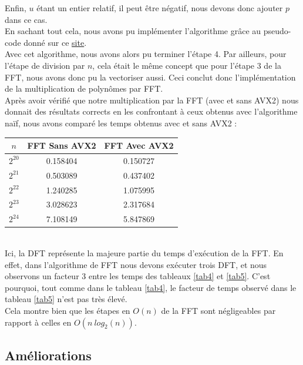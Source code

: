 \documentclass[12pt, a4paper]{article}
\begin{document}
Enfin, $u$ étant un entier relatif, il peut être négatif, nous devons donc ajouter $p$ dans ce cas. \\
\indent En sachant tout cela, nous avons pu implémenter l'algorithme grâce au pseudo-code donné sur ce \href{https://www.dcode.fr/identite-bezout}{\underline{\color{blue}site}}. \\
\indent Avec cet algorithme, nous avons alors pu terminer l'étape 4. Par ailleurs, pour l'étape de division par $n$, cela était le même concept que pour l'étape 3 de la FFT, nous avons donc pu la vectoriser aussi. Ceci conclut donc l'implémentation de la multiplication de polynômes par FFT. \\
\indent Après avoir vérifié que notre multiplication par la FFT (avec et sans AVX2) nous donnait des résultats corrects en les confrontant à ceux obtenus avec l'algorithme naïf, nous avons comparé les temps obtenus avec et sans AVX2 :

\begin{center}
\begin{tabular}{||c c c||}
\hline
$n$ & FFT Sans AVX2 & FFT Avec AVX2 \\
\hline\hline
$2^{20}$ & 0.158404 & 0.150727 \\
\hline
$2^{21}$ & 0.503089 & 0.437402 \\
\hline
$2^{22}$ & 1.240285 & 1.075995 \\
\hline
$2^{23}$ & 3.028623 & 2.317684 \\
\hline
$2^{24}$ & 7.108149 & 5.847869 \\
\hline
\end{tabular}
\end{center}
{}
\ \\
\indent Ici, la DFT représente la majeure partie du temps d'exécution de la FFT. 
En effet, dans l'algorithme de FFT nous devons exécuter trois DFT, et nous observons un facteur 3 entre les temps des tableaux \ref{tab4} et \ref{tab5}. C'est pourquoi, tout comme dans le tableau \ref{tab4}, le facteur de temps observé dans le tableau \ref{tab5} n'est pas très élevé. \\
Cela montre bien que les étapes en $O(n)$ de la FFT sont négligeables par rapport à celles en $O(n\ log_2(n))$.

\subsection{Améliorations}
\label{NTL}
\end{document}
